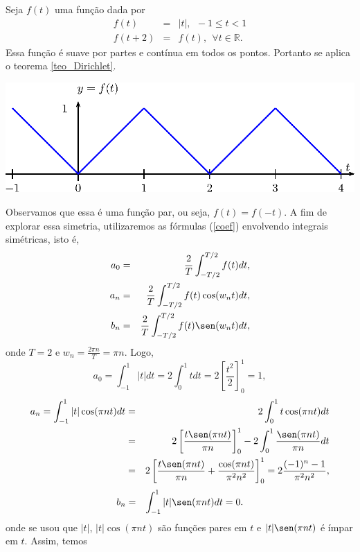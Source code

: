 \begin{ex}\label{ex_triangular} Seja $f(t)$ uma função dada por
\begin{eqnarray*}
f(t)&=&|t|, \ \ -1\leq t<1\\
f(t+2)&=&f(t),\ \ \forall t\in\mathbb{R}.
\end{eqnarray*}
Essa função é suave por partes e contínua em todos os pontos. Portanto se aplica o teorema \ref{teo_Dirichlet}.
\begin{center}
\includegraphics{cap_series/pics/figura_1}
\end{center}
Observamos que essa é uma função par, ou seja, $f(t)=f(-t)$. A fim de explorar essa simetria, utilizaremos as fórmulas (\ref{coef}) envolvendo integrais simétricas, isto é,
  \begin{eqnarray*}
   a_0&=& \frac{2}{T}\int_{-T/2}^{T/2} f(t)dt,\\
   a_n&=&  \frac{2}{T}\int_{-T/2}^{T/2} f(t)\cos(w_nt)dt,\\
   b_n&=&\frac{2}{T}\int_{-T/2}^{T/2} f(t)\sen(w_nt)dt,
  \end{eqnarray*}
onde $T=2$ e $w_n=\frac{2\pi n}{T}=\pi n$. Logo,
  \begin{equation*}
   a_0= \int_{-1}^{1} |t| dt=2\int_{0}^{1} t dt=2\left[\frac{t^2}{2}\right]_0^1=1,
	\end{equation*}
	\begin{eqnarray*}
   a_n=  \int_{-1}^{1} |t|\cos(\pi n t)dt&=&2 \int_{0}^{1} t\cos(\pi n t)dt\\&=&2\left[\frac{t\sen(\pi n t)}{\pi n}\right]_0^1-2\int_0^1\frac{\sen(\pi n t)}{\pi n}dt\\
	&=&2\left[\frac{t\sen(\pi n t)}{\pi n}+\frac{\cos(\pi n t)}{\pi^2 n^2}\right]_0^1=2\frac{(-1)^n-1}{\pi^2n^2},
	 \end{eqnarray*}
	\begin{eqnarray*}
   b_n&=&\int_{-1}^{1} |t|\sen(\pi n t)dt=0.
  \end{eqnarray*}
onde se usou que $|t|$, $|t|\cos(\pi n t)$ são funções pares em $t$ e $|t|\sen(\pi n t)$ é ímpar em $t$. Assim, temos
\begin{equation}

\end{equation}
\end{ex}
